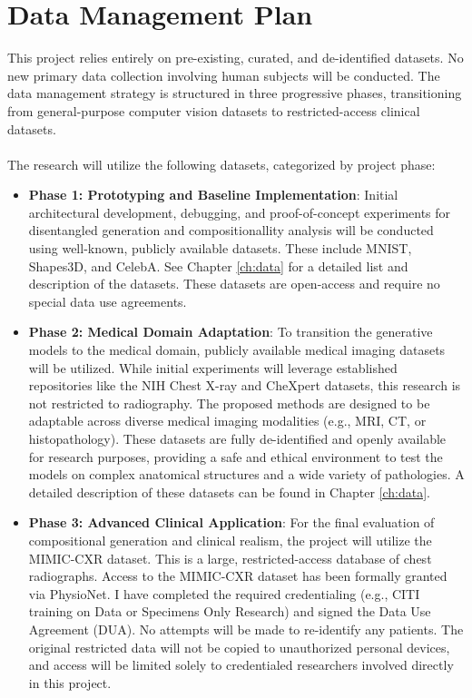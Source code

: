 \chapter{Data Management Plan}\label{ch:DataPlan}

This project relies entirely on pre-existing, curated, and de-identified datasets. 
No new primary data collection involving human subjects will be conducted. The data 
management strategy is structured in three progressive phases, transitioning from 
general-purpose computer vision datasets to restricted-access clinical datasets. \\
\\
The research will utilize the following datasets, categorized by project phase: 
\begin{itemize}
    \item \textbf{Phase 1: Prototyping and Baseline Implementation}: Initial architectural 
    development, debugging, and proof-of-concept experiments for disentangled generation 
    and compositionallity analysis will be conducted using well-known, publicly available 
    datasets. These include MNIST, Shapes3D, and CelebA. See Chapter \ref{ch:data} for a 
    detailed list and description of the datasets. These datasets are open-access and 
    require no special data use agreements. 
    \item \textbf{Phase 2: Medical Domain Adaptation}: To transition the generative models to the medical domain, publicly available medical imaging datasets will be utilized. While initial experiments will leverage established repositories like the NIH Chest X-ray and CheXpert datasets, this research is not restricted to radiography. The proposed methods are designed to be adaptable across diverse medical imaging modalities (e.g., MRI, CT, or histopathology). These datasets are fully de-identified and openly available for research purposes, providing a safe and ethical environment to test the models on complex anatomical structures and a wide variety of pathologies. A detailed description of these datasets can be found in Chapter \ref{ch:data}. 
    \item \textbf{Phase 3: Advanced Clinical Application}: For the final evaluation of 
    compositional generation and clinical realism, the project will utilize the MIMIC-CXR dataset. 
    This is a large, restricted-access database of chest radiographs. Access to the MIMIC-CXR 
    dataset has been formally granted via PhysioNet. I have completed the required credentialing 
    (e.g., CITI training on Data or Specimens Only Research) and signed the Data Use Agreement (DUA). 
    No attempts will be made to re-identify any patients. The original restricted data will not 
    be copied to unauthorized personal devices, and access will be limited solely to credentialed 
    researchers involved directly in this project. 
\end{itemize} 
